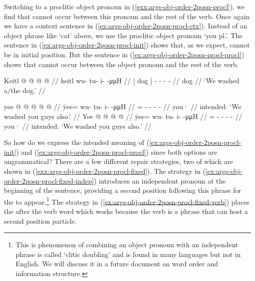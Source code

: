 Switching to a proclitic object pronoun in (\ref{exx:args-obj-order-2posn-procl}), we find that  cannot occur between this pronoun and the rest of the verb. Once again we have a context sentence in (\ref{ex:args-obj-order-2posn-procl-ctx}). Instead of an object phrase like  ‘cat’ above, we use the proclitic object pronoun  ‘you pl.’. The sentence in (\ref{ex:args-obj-order-2posn-procl-init}) shows that, as we expect,  cannot be in initial position. But the sentence in (\ref{ex:args-obj-order-2posn-procl-procl}) shows that  cannot occur between the object pronoun  and the rest of the verb.

\ex\label{ex:args-obj-order-2posn-procl-ctx}%
%
\begingl
	\gla	{} Keitl {}  @ {} @ {} @ {} @ {} //
	\glb	{} keitl {} wu- tu- i-  -μμH //
	\glc	{}[ dog {}] - - -  - //
	\gld	{} dog {}  {} {} {} {} //
	\glft	‘We washed a/the dog.’
		//
\endgl
\xe

\pex\label{exx:args-obj-order-2posn-procl}%
\a\label{ex:args-obj-order-2posn-procl-init}%
%
\ljudge{*}%
\begingl
	\gla	{} yee @  @ {} @ {} @ {} @ {} //
	\glb	{} ÿee= wu- tu- i-  -μμH //
	\glc	{} = - - -  - //
	\gld	{} you·  {} {} {} {} //
	\glft	intended: ‘We washed you guys also.’
		//
\endgl
\a\label{ex:args-obj-order-2posn-procl-procl}%
%
\ljudge{*}%
\begingl
	\gla	Yee   @ {} @ {} @ {} @ {} //
	\glb	ÿee=  wu- tu- i-  -μμH //
	\glc	{}=  - - -  - //
	\gld	you·   {} {} {} {} //
	\glft	intended: ‘We washed you guys also.’
		//
\endgl
\xe

So how do we express the intended meaning of (\ref{ex:args-obj-order-2posn-procl-init}) and (\ref{ex:args-obj-order-2posn-procl-procl}) since both options are ungrammatical? There are a few different repair strategies, two of which are shown in (\ref{exx:args-obj-order-2posn-procl-fixed}). The strategy in (\ref{ex:args-obj-order-2posn-procl-fixed-indep}) introduces an independent pronoun at the beginning of the sentence, providing a second position following this phrase for the  to appear.\footnote{This is phenomenon of combining an object pronoun with an independent phrase is called ‘clitic doubling’ and is found in many languages but not in English. We will discuss it in a future document on word order and information structure.} The strategy in (\ref{ex:args-obj-order-2posn-procl-fixed-verb}) places the  after the verb word which works because the verb is a phrase that can host a second position particle.

